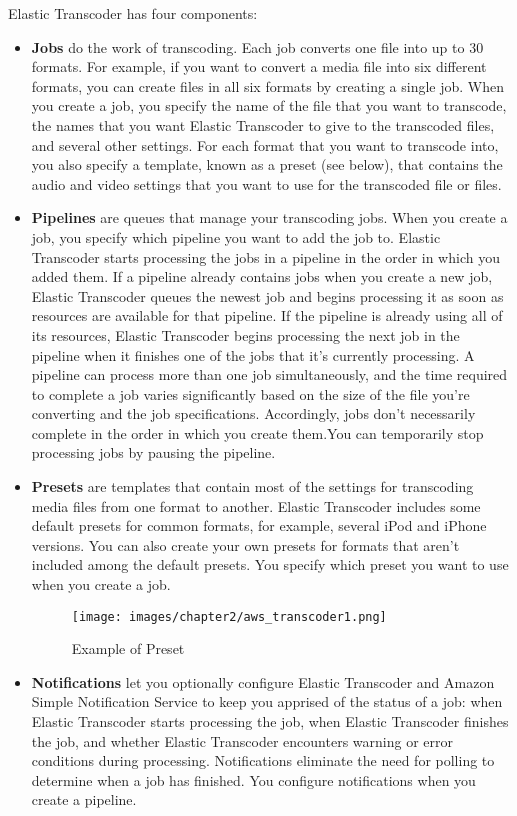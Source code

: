 Elastic Transcoder has four components:
\begin{itemize}

\item \textbf{Jobs} do the work of transcoding. Each job converts one file into up to 30 formats. For example, if you want to convert a media file into six different formats, you can create files in all six formats by creating a single job. When you create a job, you specify the name of the file that you want to transcode, the names that you want Elastic Transcoder to give to the transcoded files, and several other settings. For each format that you want to transcode into, you also specify a template, known as a preset (see below), that contains the audio and video settings that you want to use for the transcoded file or files.

\item \textbf{Pipelines} are queues that manage your transcoding jobs. When you create a job, you specify which pipeline you want to add the job to. Elastic Transcoder starts processing the jobs in a pipeline in the order in which you added them. If a pipeline already contains jobs when you create a new job, Elastic Transcoder queues the newest job and begins processing it as soon as resources are available for that pipeline. If the pipeline is already using all of its resources, Elastic Transcoder begins processing the next job in the pipeline when it finishes one of the jobs that it's currently processing. A pipeline can process more than one job simultaneously, and the time required to complete a job varies significantly based on the size of the file you're converting and the job specifications. Accordingly, jobs don't necessarily complete in the order in which you create them.You can temporarily stop processing jobs by pausing the pipeline.

\item \textbf{Presets} are templates that contain most of the settings for transcoding media files from one format to another. Elastic Transcoder includes some default presets for common formats, for example, several iPod and iPhone versions. You can also create your own presets for formats that aren't included among the default presets. You specify which preset you want to use when you create a job.


\begin{figure}[htbp] %
 \centering
 \texttt{[image: images/chapter2/aws\_transcoder1.png]}\hfill
 \caption[Example of Preset]{Example of Preset}
 \label{fig:fourV}
\end{figure}


\item \textbf{Notifications} let you optionally configure Elastic Transcoder and Amazon Simple Notification Service to keep you apprised of the status of a job: when Elastic Transcoder starts processing the job, when Elastic Transcoder finishes the job, and whether Elastic Transcoder encounters warning or error conditions during processing. Notifications eliminate the need for polling to determine when a job has finished. You configure notifications when you create a pipeline.
\end{itemize}

